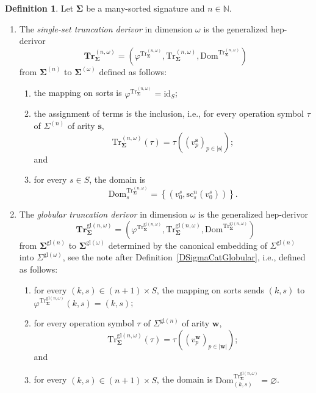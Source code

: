 \documentclass[a4paper, reqno
]{amsart}
\newcommand{\bb}[1]{\ensuremath{\lvert #1 \rvert}}
\newcommand{\sig}[1]{\mathbf{#1}}             %
\newcommand{\Dom}{\mathrm{Dom}}
\newcommand{\id}{\mathrm{id}}
\newcommand{\gl}{\mathrm{gl}}                %
\newcommand{\src}{\mathrm{sc}}
\newcommand{\Tr}{\mathrm{Tr}}
\newcommand{\bTr}{\mathbf{Tr}}
\theoremstyle{plain}
\theoremstyle{definition}
\newtheorem{definition}[theorem]{Definition}
\begin{document}
\begin{definition}\label{DTruncOmegaDerivor}
Let $\sig{\Sigma}$ be a many-sorted signature and $n\in\mathbb{N}$.
\begin{enumerate}
\item The \emph{single-set truncation derivor} in dimension $\omega$ is the generalized hep-derivor
$$
\bTr^{(n,\omega)}_{\sig{\Sigma}}=\left(\varphi^{\Tr^{(n,\omega)}_{\sig{\Sigma}}},\Tr^{(n,\omega)}_{\sig{\Sigma}},\Dom^{\Tr^{(n,\omega)}_{\sig{\Sigma}}}\right)
$$
from $\sig{\Sigma}^{(n)}$ to $\sig{\Sigma}^{(\omega)}$ defined as follows:
\begin{enumerate}
\item the mapping on sorts is $\varphi^{\Tr^{(n,\omega)}_{\sig{\Sigma}}}=\id_{S}$;
\item the assignment of terms is the inclusion, i.e., for every operation symbol $\tau$ of $\Sigma^{(n)}$ of arity $\mathbf{s}$,
$$
\Tr^{(n,\omega)}_{\sig{\Sigma}}(\tau)=\tau((v^{\mathbf{s}}_{p})_{p\in\bb{\mathbf{s}}});
$$
and
\item for every $s\in S$, the domain is
$$
\Dom^{\Tr^{(n,\omega)}_{\sig{\Sigma}}}_{s}=\left\lbrace\left(v^{s}_{0},\src^{n}_{s}(v^{s}_{0})\right)\right\rbrace.
$$
\end{enumerate}
\item The \emph{globular truncation derivor} in dimension $\omega$ is the generalized hep-derivor
$$
\bTr^{\gl(n,\omega)}_{\sig{\Sigma}}=\left(\varphi^{\Tr^{\gl(n,\omega)}_{\sig{\Sigma}}},\Tr^{\gl(n,\omega)}_{\sig{\Sigma}},\Dom^{\Tr^{\gl(n,\omega)}_{\sig{\Sigma}}}\right)
$$
from $\sig{\Sigma}^{\gl(n)}$ to $\sig{\Sigma}^{\gl(\omega)}$ determined by the canonical embedding of $\Sigma^{\gl(n)}$ into $\Sigma^{\gl(\omega)}$, see the note after Definition~\ref{DSigmaCatGlobular}, i.e., defined as follows:
\begin{enumerate}
\item for every $(k,s)\in(n+1)\times S$, the mapping on sorts sends $(k,s)$ to $\varphi^{\Tr^{\gl(n,\omega)}_{\sig{\Sigma}}}(k,s)=(k,s)$;
\item for every operation symbol $\tau$ of $\Sigma^{\gl(n)}$ of arity $\mathbf{w}$,
$$
\Tr^{\gl(n,\omega)}_{\sig{\Sigma}}(\tau)=\tau((v^{\mathbf{w}}_{p})_{p\in\bb{\mathbf{w}}});
$$
and
\item for every $(k,s)\in(n+1)\times S$, the domain is $\Dom^{\Tr^{\gl(n,\omega)}_{\sig{\Sigma}}}_{(k,s)}=\varnothing$.
\end{enumerate}
\end{enumerate}
\end{definition}
\end{document}
